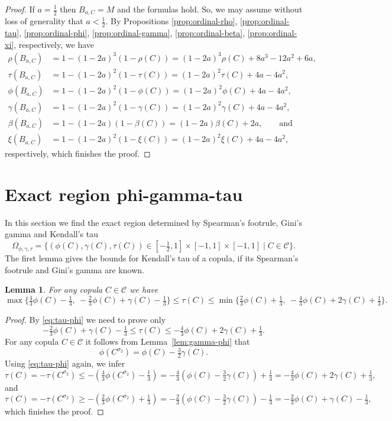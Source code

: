 \documentclass[12pt,a4paper]{amsart}
\newtheorem{lemma}[theorem]{Lemma}
\theoremstyle{definition}
\newcommand{\CC}{\mathcal{C}}
\begin{document}
\begin{proof}
If $a=\tfrac12$ then $B_{a,C}=M$ and the formulas hold. So, we may assume without loss of generality that $a<\tfrac12$.
By Propositions \ref{prop:ordinal-rho},  \ref{prop:ordinal-tau},  \ref{prop:ordinal-phi},  \ref{prop:ordinal-gamma},  \ref{prop:ordinal-beta}, \ref{prop:ordinal-xi}, respectively,   we have
\begin{align*}
\rho(B_{a,C}) &= 1-(1-2a)^3(1-\rho(C)) = (1-2a)^3\rho(C) + 8a^3 - 12a^2 + 6a, \\
\tau(B_{a,C}) &= 1-(1-2a)^2(1-\tau(C)) = (1-2a)^2\tau(C) + 4a - 4a^2, \\
\phi(B_{a,C}) &= 1-(1-2a)^2(1-\phi(C)) = (1-2a)^2\phi(C) + 4a - 4a^2, \\
\gamma(B_{a,C}) &= 1-(1-2a)^2(1-\gamma(C)) = (1-2a)^2\gamma(C) + 4a - 4a^2, \\
\beta(B_{a,C}) &= 1-(1-2a)(1-\beta(C)) = (1-2a)\beta(C) + 2a, \qquad \text{and} \\
\xi(B_{a,C}) &= 1-(1-2a)^2(1-\xi(C)) = (1-2a)^2\xi(C) + 4a - 4a^2, 
\end{align*}
respectively, which finishes the proof.
\end{proof}

\section{Exact region phi-gamma-tau}\label{sec:region}

In this section we find the exact region determined by Spearman's footrule, Gini's gamma and Kendall's tau
$$\Omega_{\phi, \gamma, \tau} = \big\{( \phi(C), \gamma(C), \tau(C)) \in [-\tfrac12, 1] \times [-1, 1] \times [-1, 1] \mid C \in \CC\big\}.$$
The first lemma gives the bounds for Kendall's tau of a copula, if its Spearman's footrule and Gini's gamma are known.

\begin{lemma}\label{lem:bounds}
For any copula $C\in\CC$ we have
$$ \max\big\{\tfrac43\phi(C)-\tfrac13,\ -\tfrac23\phi(C)+\gamma(C)-\tfrac13 \big\} \le \tau(C) \le \min\big\{\tfrac23\phi(C)+\tfrac13,\ -\tfrac43\phi(C)+2\gamma(C)+\tfrac13 \big\}.$$
\end{lemma}

\begin{proof}
By \eqref{eq:tau-phi} we need to prove only
$$ -\tfrac23\phi(C)+\gamma(C)-\tfrac13 \le \tau(C) \le -\tfrac43\phi(C)+2\gamma(C)+\tfrac13.$$
For any copula $C\in \CC$ it follows from Lemma~\ref{lem:gamma-phi} that
\begin{equation}
    \phi(C^{\sigma_2}) = \phi(C) - \tfrac32 \gamma(C).
\end{equation}
Using \eqref{eq:tau-phi} again, we infer
$$\tau(C) = - \tau(C^{\sigma_2}) \le -(\tfrac43\phi(C^{\sigma_2})-\tfrac13) = -\tfrac43(\phi(C) - \tfrac32 \gamma(C)) + \tfrac13  = -\tfrac43\phi(C)+2\gamma(C)+\tfrac13,$$
and
$$\tau(C) = - \tau(C^{\sigma_2}) \ge -(\tfrac23\phi(C^{\sigma_2})+\tfrac13) = -\tfrac23(\phi(C) - \tfrac32 \gamma(C)) - \tfrac13  = -\tfrac23\phi(C)+\gamma(C)-\tfrac13,$$
which finishes the proof.
\end{proof}
\end{document}
